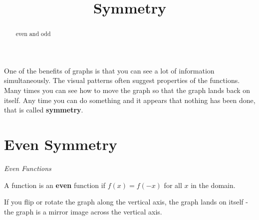 \documentclass{ximera}
\title{Symmetry}
\begin{document}
\begin{abstract}
even and odd
\end{abstract}
\maketitle



One of the benefits of graphs is that you can see a lot of information simultaneously.  The visual patterns often suggest properties of the functions.  Many times you can see how to move the graph so that the graph lands back on itself.  Any time you can do something and it appears that nothing has been done, that is called \textbf{symmetry}.





\section{Even Symmetry}


\begin{definition} \textit{Even Functions}

A function is an \textbf{even} function if $f(x) = f(-x)$ for all $x$ in the domain.

\end{definition}


If you flip or rotate the graph along the vertical axis, the graph lands on itself - the graph is a mirror image across the vertical axis.
\end{document}
